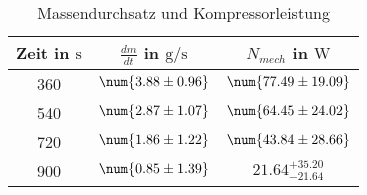 \begin{table}
 \centering
 \begin{tabular}{S S S }
 \toprule
{Zeit in $\si{\second}$} & {$\frac{dm}{dt}$ in $\si{\gram \per \second}$} & {$N_{mech}$ in $\si{\watt}$}  \\
\midrule

360  & $\num{ 3.88 \pm 0.96 }$ & $\num{ 77.49 \pm 19.09 }$ \\

540  & $\num{ 2.87 \pm 1.07 }$ & $\num{ 64.45 \pm 24.02 }$ \\

720  & $\num{ 1.86 \pm 1.22 }$ & $\num{ 43.84 \pm 28.66 }$ \\

900  & $\num{ 0.85 \pm 1.39 }$ & $\num{ 21.64}^{+35.20}_{-21.64} $ \\





\bottomrule
 \end{tabular}
 \caption{Massendurchsatz und Kompressorleistung}
 \label{tab: dmdtNmech}
  \end{table}

